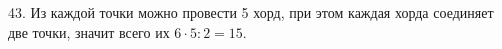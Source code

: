 43. Из каждой точки можно провести 5 хорд, при этом каждая хорда соединяет две точки, значит всего их $6\cdot5:2=15.$\\
